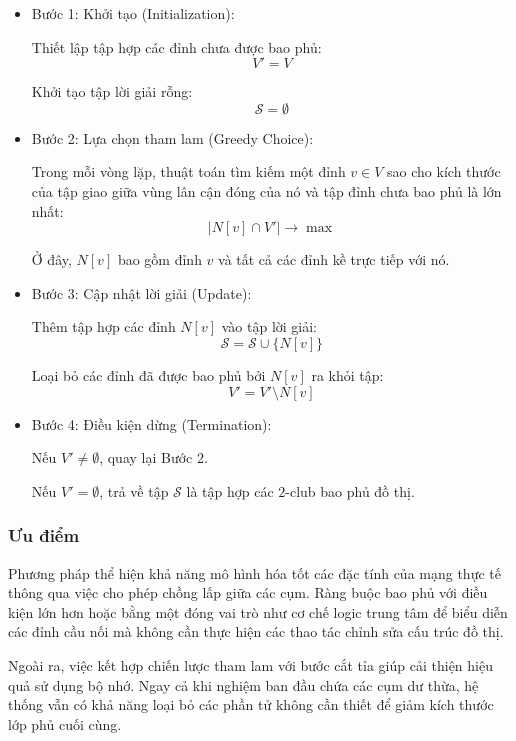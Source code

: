 \begin{itemize}
    \item {Bước 1: Khởi tạo (Initialization):}
    
    Thiết lập tập hợp các đỉnh chưa được bao phủ:
    \[
    V' = V
    \]
    
    Khởi tạo tập lời giải rỗng:
    \[
    \mathcal{S} = \emptyset
    \]

    \item {Bước 2: Lựa chọn tham lam (Greedy Choice):}
    
    Trong mỗi vòng lặp, thuật toán tìm kiếm một đỉnh $v \in V$ sao cho kích thước của tập giao giữa vùng lân cận đóng của nó và tập đỉnh chưa bao phủ là lớn nhất:
    \[
    |N[v] \cap V'| \rightarrow \max
    \]
    
    Ở đây, $N[v]$ bao gồm đỉnh $v$ và tất cả các đỉnh kề trực tiếp với nó.

    \item {Bước 3: Cập nhật lời giải (Update):}
    
    Thêm tập hợp các đỉnh $N[v]$ vào tập lời giải:
    \[
    \mathcal{S} = \mathcal{S} \cup \{N[v]\}
    \]
    
    Loại bỏ các đỉnh đã được bao phủ bởi $N[v]$ ra khỏi tập:
    \[
    V' = V' \setminus N[v]
    \]

    \item {Bước 4: Điều kiện dừng (Termination):}
    
    Nếu $V' \neq \emptyset$, quay lại Bước 2.
    
    Nếu $V' = \emptyset$, trả về tập $\mathcal{S}$ là tập hợp các $2$-club bao phủ đồ thị.
\end{itemize}





\subsubsection{Ưu điểm}
Phương pháp thể hiện khả năng mô hình hóa tốt các đặc tính của mạng thực tế thông qua việc cho phép chồng lấp giữa các cụm. Ràng buộc bao phủ với điều kiện lớn hơn hoặc bằng một đóng vai trò như cơ chế logic trung tâm để biểu diễn các đỉnh cầu nối mà không cần thực hiện các thao tác chỉnh sửa cấu trúc đồ thị.

Ngoài ra, việc kết hợp chiến lược tham lam với bước cắt tỉa giúp cải thiện hiệu quả sử dụng bộ nhớ. Ngay cả khi nghiệm ban đầu chứa các cụm dư thừa, hệ thống vẫn có khả năng loại bỏ các phần tử không cần thiết để giảm kích thước lớp phủ cuối cùng.


